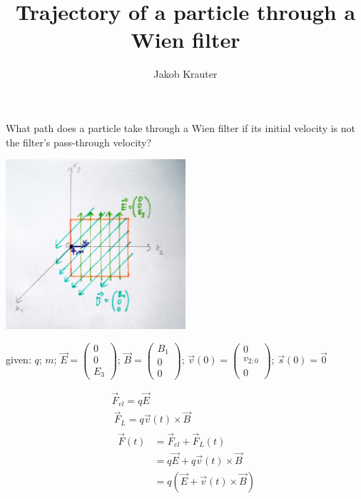 \documentclass[english, a4paper, 10pt]{article}
\title{Trajectory of a particle through a Wien filter}
\author{Jakob Krauter}
\date{\monthname \space \the\year}
\begin{document}
\maketitle

What path does a particle take through a Wien filter if its initial velocity is not the filter's pass-through velocity?

\vspace{2pt}

\centering
\includegraphics[width=0.5\textwidth]{sketch}

\vspace{2pt}

given: $q$; $m$; $\vec{E}=\begin{pmatrix} 0 \\ 0 \\ E_3 \end{pmatrix}$; $\vec{B}=\begin{pmatrix} B_1 \\ 0 \\ 0 \end{pmatrix}$; $\vec{v}(0)=\begin{pmatrix} 0 \\ v_{2;0} \\ 0 \end{pmatrix}$; $\vec{s}(0) = \vec{0}$

\vspace{2pt}

\begin{gather}
\vec{F}_{el} = q \vec{E} \\\
%
\vec{F}_L = q \vec{v}(t) \times \vec{B} \\\
%
\begin{split}
\vec{F}(t) &= \vec{F}_{el} + \vec{F}_L(t)		\\\
           &= q \vec{E} + q \vec{v}(t) \times \vec{B}   \\\
           &= q (\vec{E} + \vec{v}(t) \times \vec{B})
\end{split}
\end{gather}
\end{document}

